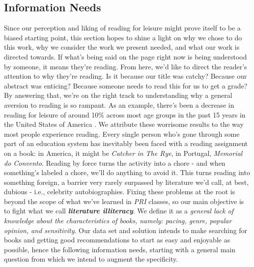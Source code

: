 \documentclass[conference]{IEEEtran}
\begin{document}
\subsection{Information Needs}
Since our perception and liking of reading for leisure might prove itself to be a biased starting point, this section hopes to shine a light on why we chose to do this work, why we consider the work we present needed, and what our work is directed towards. \newline
If what’s being said on the page right now is being understood by someone, it means they’re reading. From here, we’d like to direct the reader’s attention to why they’re reading. Is it because our title was catchy? Because our abstract was enticing? Because someone needs to read this for us to get a grade? \newline
By answering that, we’re on the right track to understanding why a general aversion to reading is so rampant. As an example, there’s been a decrease in reading for leisure of around 10\% across most age groups in the past 15 years in the United States of America \cite{washingtonpost}. \newline
We attribute these worrisome results to the way most people experience reading. Every single person who's gone through some part of an education system has inevitably been faced with a reading assignment on a book: in America, it might be \textit{Catcher in The Rye}, in Portugal, \textit{Memorial do Convento}. Reading by force turns the activity into a chore - and when something’s labeled a chore, we'll do anything to avoid it. \newline
This turns reading into something foreign, a barrier very rarely surpassed by literature we'd call, at best, dubious - i.e., celebrity autobiographies. \newline
Fixing these problems at the root is beyond the scope of what we've learned in \textit{PRI} classes, so our main objective is to fight what we call \textbf{\textit{literature illiteracy}}. We define it as a \textit{general lack of knowledge about the characteristics of books, namely: pacing, genre, popular opinion, and sensitivity}.  \newline
Our data set and solution intends to make searching for books and getting good recommendations to start as easy and enjoyable as possible, hence the following information needs, starting with a general main question from which we intend to augment the specificity.
\end{document}
